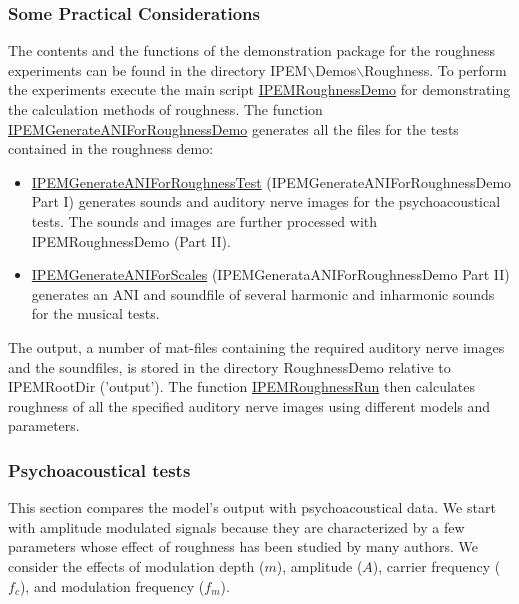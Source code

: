 \subsubsection*{Some Practical Considerations}
The contents and the functions of the demonstration package for
the roughness experiments can be found in the directory
IPEM$\backslash$Demos$\backslash$Roughness. To perform the
experiments execute the main script
\hyperlink{FuncRef:IPEMRoughnessDemo}{IPEMRoughnessDemo} for
demonstrating the calculation methods of roughness. The function
\hyperlink{FuncRef:IPEMGenerateANIForRoughnessDemo}{IPEMGenerateANIForRoughnessDemo}
generates all the files for the tests contained in the roughness
demo:
\begin{itemize}
\item
\hyperlink{FuncRef:IPEMGenerateANIForRoughnessTest}{IPEMGenerateANIForRoughnessTest}
(IPEMGenerateANIForRoughnessDemo Part I) generates sounds and
auditory nerve images for the psychoacoustical tests. The sounds
and images are further processed with IPEMRoughnessDemo (Part II).

\item
\hyperlink{FuncRef:IPEMGenerateANIForScales}{IPEMGenerateANIForScales}
(IPEMGenerataANIForRoughnessDemo Part II) generates an ANI and
soundfile of several harmonic and inharmonic sounds for the
musical tests.
\end{itemize}

The output, a number of mat-files containing the required auditory
nerve images and the soundfiles, is stored in the directory
RoughnessDemo relative to IPEMRootDir ('output').  The function
\hyperlink{FuncRef:IPEMRoughnessRun}{IPEMRoughnessRun} then calculates roughness of all the specified auditory nerve images using
different models and parameters.

\subsubsection*{Psychoacoustical tests}
This section compares the model's output with psychoacoustical
data. We start with amplitude modulated signals because they are
characterized by a few parameters whose effect of roughness has
been studied by many authors. We consider the effects of
modulation depth ($m$), amplitude ($A$), carrier frequency
($f_c$), and modulation frequency ($f_m$).

